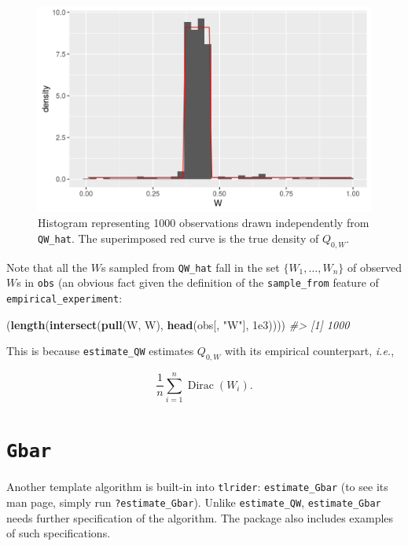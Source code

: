 \documentclass[11pt,openright,twoside]{book}
\newenvironment{Shaded}{\begin{snugshade}}{\end{snugshade}}
\newcommand{\CommentTok}[1]{\textcolor[rgb]{0.56,0.35,0.01}{\textit{#1}}}
\newcommand{\FloatTok}[1]{\textcolor[rgb]{0.00,0.00,0.81}{#1}}
\newcommand{\KeywordTok}[1]{\textcolor[rgb]{0.13,0.29,0.53}{\textbf{#1}}}
\newcommand{\NormalTok}[1]{#1}
\newcommand{\StringTok}[1]{\textcolor[rgb]{0.31,0.60,0.02}{#1}}
\DeclareMathOperator{\Dirac}{Dirac}
\theoremstyle{definition}
\theoremstyle{definition}
\theoremstyle{definition}
\theoremstyle{remark}
\begin{document}
\begin{figure}

{\centering \includegraphics[width=0.7\linewidth]{img/estimate-QW-two-1} 

}

\caption{Histogram representing 1000 observations drawn independently from \texttt{QW\_hat}. The superimposed red curve is the true density of \(Q_{0,W}\).}\label{fig:estimate-QW-two}
\end{figure}

Note that all the \(W\)s sampled from \texttt{QW\_hat} fall in the set \(\{W_{1}, \ldots, W_{n}\}\) of observed \(W\)s in \texttt{obs} (an obvious fact given the definition of
the \texttt{sample\_from} feature of \texttt{empirical\_experiment}:

\begin{Shaded}
\begin{Highlighting}[]
\NormalTok{(}\KeywordTok{length}\NormalTok{(}\KeywordTok{intersect}\NormalTok{(}\KeywordTok{pull}\NormalTok{(W, W), }\KeywordTok{head}\NormalTok{(obs[, }\StringTok{"W"}\NormalTok{], }\FloatTok{1e3}\NormalTok{))))}
\CommentTok{#> [1] 1000}
\end{Highlighting}
\end{Shaded}

This is because \texttt{estimate\_QW} estimates \(Q_{0,W}\) with its empirical
counterpart, \emph{i.e.},

\begin{equation*}\frac{1}{n} \sum_{i=1}^{n} \Dirac(W_{i}).\end{equation*}

\hypertarget{nuisance-Gbar}{%
\section{\texorpdfstring{\texttt{Gbar}}{Gbar}}\label{nuisance-Gbar}}

Another template algorithm is built-in into \texttt{tlrider}: \texttt{estimate\_Gbar} (to see
its man page, simply run \texttt{?estimate\_Gbar}). Unlike \texttt{estimate\_QW},
\texttt{estimate\_Gbar} needs further specification of the algorithm. The package also
includes examples of such specifications.
\end{document}
